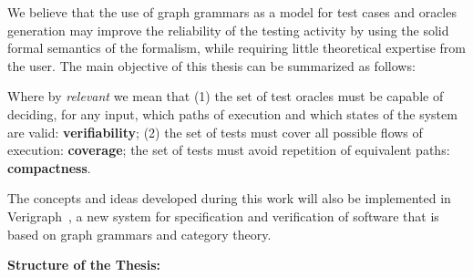 We believe that the use of graph grammars as a model for test cases and oracles generation may improve the reliability of the testing activity by using the solid formal semantics of the formalism, while requiring little theoretical expertise from the user. The main objective of this thesis can be summarized as follows:

\begin{intuition}
\end{intuition}\hfill\break

Where by \emph{relevant} we mean that (1) the set of test oracles must be capable of deciding, for any input, which paths of execution and which states of the system are valid: \textbf{verifiability}; (2) the set of tests must cover all possible flows of execution: \textbf{coverage}; the set of tests must avoid repetition of equivalent paths: \textbf{compactness}.

The concepts and ideas developed during this work will also be implemented in Verigraph~\cite{verigraph,Costa2016}, a new system for specification and verification of software that is based on graph grammars and category theory.



\hfill \break
\textbf{Structure of the Thesis:}

